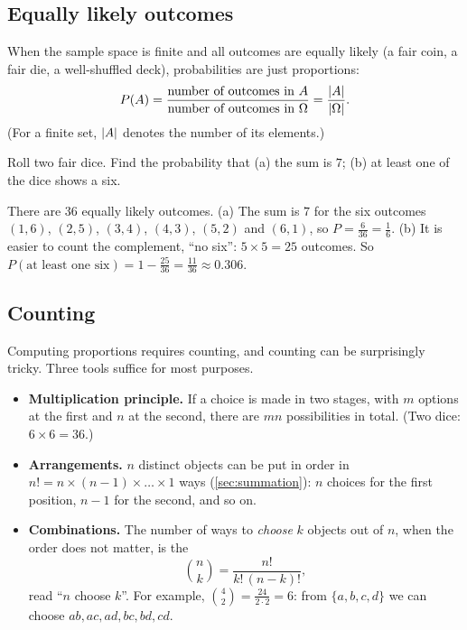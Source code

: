 \subsection{Equally likely outcomes}

When the sample space is finite and all outcomes are equally likely (a fair coin,
a fair die, a well-shuffled deck), probabilities are just proportions:
\[
  P(A) = \frac{\text{number of outcomes in } A}{\text{number of outcomes in } \Omega}
  = \frac{\lvert A\rvert}{\lvert\Omega\rvert} .
\]
(For a finite set, $\lvert A\rvert$ denotes the number of its elements.)

\begin{example}\label{ex:two-dice}
Roll two fair dice. Find the probability that (a) the sum is $7$; (b) at least
one of the dice shows a six.

\sol There are $36$ equally likely outcomes. (a) The sum is $7$ for the six
outcomes $(1,6)$, $(2,5)$, $(3,4)$, $(4,3)$, $(5,2)$ and $(6,1)$, so
$P = \frac{6}{36} = \frac16$.
(b) It is easier to count the complement, ``no six'': $5 \times 5 = 25$ outcomes.
So $P(\text{at least one six}) = 1 - \frac{25}{36} = \frac{11}{36} \approx
0.306$.
\end{example}

\subsection{Counting}

Computing proportions requires counting, and counting can be surprisingly
tricky. Three tools suffice for most purposes.

\begin{itemize}
  \item \textbf{Multiplication principle.} If a choice is made in two stages,
    with $m$ options at the first and $n$ at the second, there are $mn$
    possibilities in total. (Two dice: $6 \times 6 = 36$.)
  \item \textbf{Arrangements.} $n$ distinct objects can be put in order in
    $n! = n\times(n-1)\times\dots\times1$ ways (\cref{sec:summation}): $n$
    choices for the first position, $n - 1$ for the second, and so on.
  \item \textbf{Combinations.} The number of ways to \emph{choose} $k$ objects
    out of $n$, when the order does not matter, is the 
    \[
      \binom{n}{k} = \frac{n!}{k!\,(n-k)!},
    \]
    read ``$n$ choose $k$''. For example, $\binom42 = \frac{24}{2\cdot2} = 6$: from
    $\{a, b, c, d\}$ we can choose $ab, ac, ad, bc, bd, cd$.
\end{itemize}

